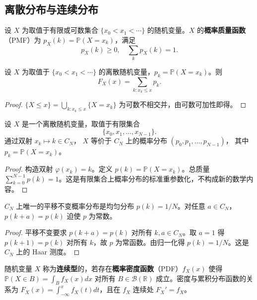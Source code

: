 \subsection{离散分布与连续分布}

\begin{definition}[离散分布]\label{def:discrete_distribution}
设 $X$ 为取值于有限或可数集合 $\{x_0 < x_1 < \cdots\}$ 的随机变量。$X$ 的\textbf{概率质量函数}（PMF）为 $p_X(k) = \mathbb{P}(X = x_k)$，满足
\[
p_X(k) \ge 0, \quad \sum_{k} p_X(k) = 1.
\]
\end{definition}

\begin{proposition}[离散分布的概率质量函数与CDF]\label{prop:pmf_cdf_relation}
设 $X$ 为取值于 $\{x_0 < x_1 < \cdots\}$ 的离散随机变量，$p_k = \mathbb{P}(X = x_k)$。则
\[
F_X(x) = \sum_{k : x_k \le x} p_k.
\]
\end{proposition}

\begin{proof}
$\{X \le x\} = \bigcup_{k: x_k \le x} \{X = x_k\}$ 为可数不相交并，由可数可加性即得。
\end{proof}

\begin{proposition}[任何有限离散分布都是循环群上的分布]
\label{prop:discrete_cyclic}
设 $X$ 是一个离散随机变量，取值于有限集合
\[
\{x_0, x_1, \dots, x_{N-1}\}.
\]
通过双射 $x_k \mapsto k \in C_N$，
$X$ 等价于 $C_N$ 上的概率分布 $(p_0, p_1, \dots, p_{N-1})$，
其中 $p_k = \mathbb{P}(X = x_k)$。
\end{proposition}
\begin{proof}
构造双射 $\varphi(x_k) = k$。定义 $p(k) = \mathbb{P}(X = x_k)$。总质量 $\sum_{k=0}^{N-1} p(k) = 1$。这是有限集合上概率分布的标准重参数化，不构成新的数学内容。
\end{proof}

\begin{proposition}[循环群上的平移不变分布]\label{prop:cyclic_uniform}
$C_N$ 上唯一的平移不变概率分布是均匀分布 $p(k) = 1/N$。对任意 $a \in C_N$，$p(k+a) = p(k)$ 迫使 $p$ 为常数。
\end{proposition}

\begin{proof}
平移不变要求 $p(k+a) = p(k)$ 对所有 $k, a \in C_N$。取 $a=1$ 得 $p(k+1) = p(k)$ 对所有 $k$，故 $p$ 为常函数。由归一化得 $p(k) = 1/N$。这是 $C_N$ 上的 Haar 测度。
\end{proof}

\begin{definition}[连续分布]\label{def:continuous_distribution}
随机变量 $X$ 称为\textbf{连续型}的，若存在\textbf{概率密度函数}（PDF）$f_X(x)$ 使得 $\mathbb{P}(X \in B) = \int_B f_X(x) dx$ 对所有 $B \in \mathcal{B}(\mathbb{R})$ 成立。密度与累积分布函数的关系为 $F_X(x) = \int_{-\infty}^{x} f_X(t) dt$，且在 $f_X$ 连续处 $F_X' = f_X$。
\end{definition}

